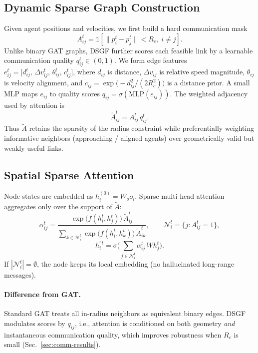 \subsection{Dynamic Sparse Graph Construction}
\label{sec:dyn-graph}

Given agent positions and velocities, we first build a hard communication mask
\begin{equation}
A_{ij}^{t}
=
\mathbb{1}\!\left[
\|p_i^{t}-p_j^{t}\| < R_c,\; i\neq j
\right].
\end{equation}
Unlike binary GAT graphs, DSGF further scores each feasible link by a
learnable communication quality $q_{ij}^{t}\in(0,1)$.
We form edge features
$e_{ij}^{t}=\bigl[d_{ij}^{t},\,\Delta v_{ij}^{t},\,\theta_{ij}^{t},\,c_{ij}^{t}\bigr]$,
where $d_{ij}$ is distance, $\Delta v_{ij}$ is relative speed magnitude,
$\theta_{ij}$ is velocity alignment, and
$c_{ij}=\exp\!\bigl(-d_{ij}^{2}/(2R_c^{2})\bigr)$ is a distance prior.
A small MLP maps $e_{ij}$ to quality scores $q_{ij}=\sigma(\mathrm{MLP}(e_{ij}))$.
The weighted adjacency used by attention is
\begin{equation}
\tilde{A}_{ij}^{t}
=
A_{ij}^{t}\, q_{ij}^{t}.
\end{equation}
Thus $\tilde{A}$ retains the sparsity of the radius constraint while
preferentially weighting informative neighbors (approaching / aligned agents)
over geometrically valid but weakly useful links.

\subsection{Spatial Sparse Attention}
\label{sec:sparse-attn}

Node states are embedded as $h_i^{(0)}=W_o o_i$.
Sparse multi-head attention aggregates only over the support of $\tilde{A}$:
\begin{equation}
\alpha_{ij}^{t}
=
\frac{
\exp\!\bigl(f(h_i^{t},h_j^{t})\bigr)\,
\tilde{A}_{ij}^{t}
}{
\sum_{k\in\mathcal{N}_i^{t}}
\exp\!\bigl(f(h_i^{t},h_k^{t})\bigr)\,
\tilde{A}_{ik}^{t}
},
\qquad
\mathcal{N}_i^{t}
=
\{j:A_{ij}^{t}=1\},
\end{equation}
\begin{equation}
h_i^{\prime\,t}
=
\sigma\!\Biggl(
\sum_{j\in\mathcal{N}_i^{t}}
\alpha_{ij}^{t}\, W h_j^{t}
\Biggr).
\end{equation}
If $|\mathcal{N}_i^{t}|=\emptyset$, the node keeps its local embedding
(no hallucinated long-range messages).

\paragraph{Difference from GAT.}
Standard GAT treats all in-radius neighbors as equivalent binary edges.
DSGF modulates scores by $q_{ij}$, i.e., attention is conditioned on both
geometry \emph{and} instantaneous communication quality, which improves
robustness when $R_c$ is small (Sec.~\ref{sec:comm-results}).

